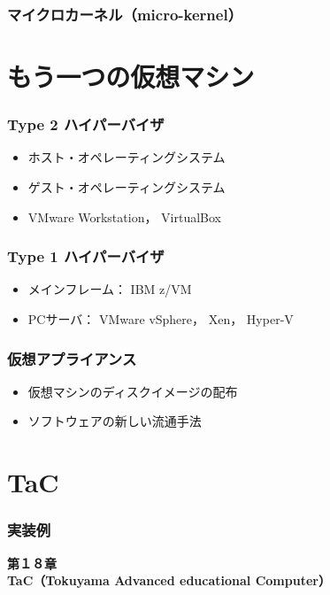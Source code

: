 \documentclass[unicode]{beamer}                   %
\begin{document}
\begin{frame}
  \frametitle{マイクロカーネル（micro-kernel）}
\end{frame}

\section{もう一つの仮想マシン}
\begin{frame}
  \frametitle{Type 2 ハイパーバイザ}
  \begin{itemize}
  \item ホスト・オペレーティングシステム
  \item ゲスト・オペレーティングシステム
  \item VMware Workstation， VirtualBox
  \end{itemize}
\end{frame}

\begin{frame}
  \frametitle{Type 1 ハイパーバイザ}
  \begin{itemize}
  \item メインフレーム： IBM z/VM
  \item PCサーバ： VMware vSphere， Xen， Hyper-V
  \end{itemize}
\end{frame}

\begin{frame}
  \frametitle{仮想アプライアンス}
  \begin{itemize}
  \item 仮想マシンのディスクイメージの配布
  \item ソフトウェアの新しい流通手法
  \end{itemize}
\end{frame}

\section{TaC}
\begin{frame}
  \frametitle{実装例}
  \vfill
  \begin{center}
    \textbf{\LARGE 第１８章} \\
    \textbf{\LARGE TaC（Tokuyama Advanced educational Computer）}
  \end{center}
  \vfill
\end{frame}
\end{document}
